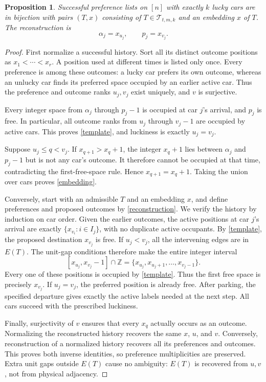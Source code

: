 \documentclass[11pt]{article}
\newtheorem{proposition}{Proposition}
\theoremstyle{definition}
\newcommand{\T}{\mathcal T}
\begin{document}
\begin{proposition}\label{bijection}
Successful preference lists on $[n]$ with exactly $k$ lucky cars are in bijection with pairs $(T,x)$ consisting of $T\in\T_{t,m,k}$ and an embedding $x$ of $T$. The reconstruction is
\begin{equation}\label{reconstruction}
 \alpha_j=x_{u_j},\qquad p_j=x_{v_j}.
\end{equation}
\end{proposition}
\begin{proof}
First normalize a successful history. Sort all its distinct outcome positions as $x_1<\cdots<x_r$. A position used at different times is listed only once. Every preference is among these outcomes: a lucky car prefers its own outcome, whereas an unlucky car finds its preferred space occupied by an earlier active car. Thus the preference and outcome ranks $u_j,v_j$ exist uniquely, and $v$ is surjective.

Every integer space from $\alpha_j$ through $p_j-1$ is occupied at car $j$'s arrival, and $p_j$ is free. In particular, all outcome ranks from $u_j$ through $v_j-1$ are occupied by active cars. This proves \eqref{template}, and luckiness is exactly $u_j=v_j$.

Suppose $u_j\le q<v_j$. If $x_{q+1}>x_q+1$, the integer $x_q+1$ lies between $\alpha_j$ and $p_j-1$ but is not any car's outcome. It therefore cannot be occupied at that time, contradicting the first-free-space rule. Hence $x_{q+1}=x_q+1$. Taking the union over cars proves \eqref{embedding}.

Conversely, start with an admissible $T$ and an embedding $x$, and define preferences and proposed outcomes by \eqref{reconstruction}. We verify the history by induction on car order. Given the earlier outcomes, the active positions at car $j$'s arrival are exactly $\{x_{v_i}:i\in I_j\}$, with no duplicate active occupants. By \eqref{template}, the proposed destination $x_{v_j}$ is free. If $u_j<v_j$, all the intervening edges are in $E(T)$. The unit-gap conditions therefore make the entire integer interval
\[
 [x_{u_j},x_{v_j}-1]\cap\mathbb Z
   =\{x_{u_j},x_{u_j+1},\ldots,x_{v_j-1}\}.
\]
Every one of these positions is occupied by \eqref{template}. Thus the first free space is precisely $x_{v_j}$. If $u_j=v_j$, the preferred position is already free. After parking, the specified departure gives exactly the active labels needed at the next step. All cars succeed with the prescribed luckiness.

Finally, surjectivity of $v$ ensures that every $x_q$ actually occurs as an outcome. Normalizing the reconstructed history recovers the same $x$, $u$, and $v$. Conversely, reconstruction of a normalized history recovers all its preferences and outcomes. This proves both inverse identities, so preference multiplicities are preserved. Extra unit gaps outside $E(T)$ cause no ambiguity: $E(T)$ is recovered from $u,v$, not from physical adjacency.
\end{proof}
\end{document}
